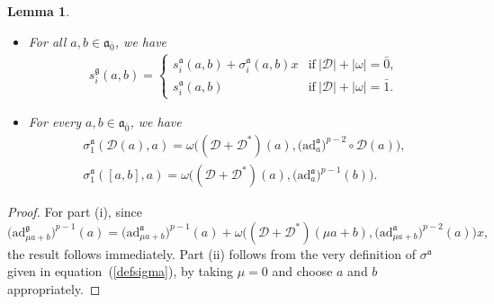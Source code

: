\documentclass[10pt,a4paper]{amsart}
\numberwithin{equation}{section}
\newtheorem{Lemma}[Theorem]{Lemma}
\begin{document}
\begin{Lemma}%
\qquad
\begin{itemize}\itemsep=0pt
\item[$(i)$] For all $a,b\in \mathfrak{a}_{\bar 0}$, we have
\begin{gather*}%
s_i^\mathfrak{g}(a,b)=
 \begin{cases}
s_i^\mathfrak{a}(a,b)+ \sigma_i^{\mathfrak{a}}(a,b)x & \text{if} \ |{\mathscr D}|+|\omega|=
{\bar 0}, \\
s_i^\mathfrak{a}(a,b) & \text{if} \ |{\mathscr D}|+|\omega|={\bar 1}.
\end{cases}
\end{gather*}
\item[$(ii)$] For every $a,b\in \mathfrak{a}_{\bar 0}$, we have
\begin{gather*}
\sigma_1^\mathfrak{a}({\mathscr D}(a),a) = \omega \bigl(({\mathscr D}+ {\mathscr D}^*)(a), \bigl(\mathrm{ad}_a^\mathfrak{a}\bigr)^{p-2}\circ {\mathscr D}(a)\bigr),\\
 \sigma_1^\mathfrak{a}([a,b], a) = \omega \bigl(({\mathscr D}+ {\mathscr D}^*)(a), \bigl(\mathrm{ad}_a^\mathfrak{a}\bigr)^{p-1}(b)\bigr).
\end{gather*}
\end{itemize}
\end{Lemma}
\begin{proof}
For part (i), since
\[
\big(\mathrm{ad}_{\mu a+b}^\mathfrak{g}\big)^{p-1}(a)=\big(\mathrm{ad}_{\mu a+b}^\mathfrak{a}\big)^{p-1}(a)+\omega\bigl(({\mathscr D}+{\mathscr D}^*)(\mu a+b),\big(\mathrm{ad}_{\mu a+b}^\mathfrak{a}\big)^{p-2}(a) \bigr)x,
\]
the result follows immediately. Part (ii) follows from the very definition of $\sigma^\mathfrak{a}$ given in equation~(\ref{defsigma}), by taking $\mu=0$ and choose $a$ and $b$ appropriately.
\end{proof}
\end{document}
